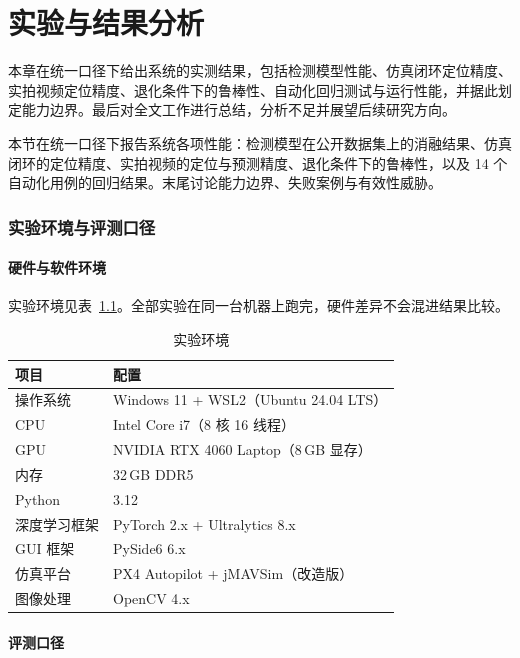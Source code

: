\chapter{实验与结果分析}

本章在统一口径下给出系统的实测结果，包括检测模型性能、仿真闭环定位精度、实拍视频定位精度、退化条件下的鲁棒性、自动化回归测试与运行性能，并据此划定能力边界。最后对全文工作进行总结，分析不足并展望后续研究方向。

本节在统一口径下报告系统各项性能：检测模型在公开数据集上的消融结果、仿真闭环的定位精度、实拍视频的定位与预测精度、退化条件下的鲁棒性，以及 14 个自动化用例的回归结果。末尾讨论能力边界、失败案例与有效性威胁。

\subsection{实验环境与评测口径}

\subsubsection{硬件与软件环境}

实验环境见表~\ref{tab:exp_env}。全部实验在同一台机器上跑完，硬件差异不会混进结果比较。

\begin{table}[htbp]
\centering
\caption{实验环境}
\label{tab:exp_env}
\small
\begin{tabular}{ll}
\toprule
\textbf{项目} & \textbf{配置} \\
\midrule
操作系统 & Windows 11 + WSL2（Ubuntu 24.04 LTS） \\
CPU & Intel Core i7（8 核 16 线程） \\
GPU & NVIDIA RTX 4060 Laptop（8\,GB 显存） \\
内存 & 32\,GB DDR5 \\
Python & 3.12 \\
深度学习框架 & PyTorch 2.x + Ultralytics 8.x \\
GUI 框架 & PySide6 6.x \\
仿真平台 & PX4 Autopilot + jMAVSim（改造版） \\
图像处理 & OpenCV 4.x \\
\bottomrule
\end{tabular}
\end{table}

\subsubsection{评测口径}

